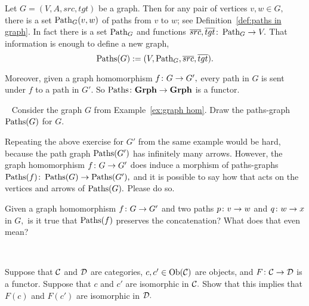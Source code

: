 \documentclass[../main/CT4S-EN-RU]{subfiles}
\begin{document}
\begin{exerciseRUS}\label{exc:rephrase functors}
\end{exerciseRUS}

\begin{exampleENG}\label{ex:paths-graph}
Let $G=(V,A,src,tgt)$ be a graph. Then for any pair of vertices $v,w\in G,$ there is a set $\operatorname{Path}_G(v,w)$ of paths from $v$ to $w$; see Definition~\ref{def:paths in graph}. In fact there is a set $\operatorname{Path}_G$ and functions $\overline{src},\overline{tgt}\colon\operatorname{Path}_G\rightarrow V.$ That information is enough to define a new graph, $$\operatorname{Paths}(G):=(V,\operatorname{Path}_G,\overline{src},\overline{tgt}).$$

Moreover, given a graph homomorphism $f\colon G\rightarrow G',$ every path in $G$ is sent under $f$ to a path in $G'.$ So $\operatorname{Paths}\colon{\mathbf{Grph}}\rightarrow{\mathbf{Grph}}$ is a functor.
\end{exampleENG}

\begin{exampleRUS}\label{ex:paths-graph}
\end{exampleRUS}

\begin{exerciseENG}\label{exc:morphisms on paths-graphs}~
\sexc Consider the graph $G$ from Example~\ref{ex:graph hom}. Draw the paths-graph $\operatorname{Paths}(G)$ for $G.$ 
\item Repeating the above exercise for $G'$ from the same example would be hard, because the path graph $\operatorname{Paths}(G')$ has infinitely many arrows. However, the graph homomorphism $f\colon G\rightarrow G'$ does induce a morphism of paths-graphs $\operatorname{Paths}(f)\colon\operatorname{Paths}(G)\rightarrow\operatorname{Paths}(G'),$ and it is possible to say how that acts on the vertices and arrows of $\operatorname{Paths}(G).$ Please do so.
\item Given a graph homomorphism $f\colon G\rightarrow G'$ and two paths $p\colon v\rightarrow w$ and $q\colon w\rightarrow x$ in $G,$ is it true that $\operatorname{Paths}(f)$ preserves the concatenation? What does that even mean?
\endsexc
\end{exerciseENG}

\begin{exerciseRUS}\label{exc:morphisms on paths-graphs}~
\end{exerciseRUS}

\begin{exerciseENG}\label{exc:functors preserve isos}
Suppose that $\mathcal{C}$ and $\mathcal{D}$ are categories, $c,c'\in\operatorname{Ob}(\mathcal{C})$ are objects, and $F\colon\mathcal{C}\rightarrow\mathcal{D}$ is a functor. Suppose that $c$ and $c'$ are isomorphic in $\mathcal{C}.$ Show that this implies that $F(c)$ and $F(c')$ are isomorphic in $\mathcal{D}.$
\end{exerciseENG}
\end{document}
